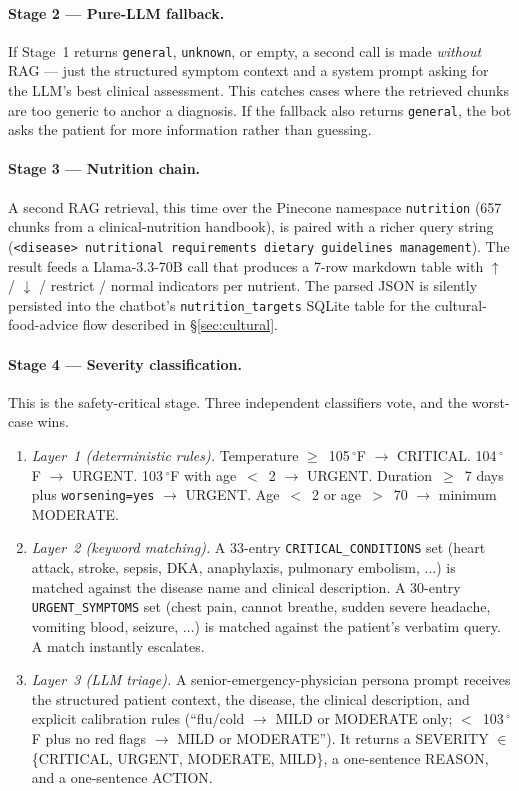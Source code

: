 \documentclass[12pt]{caltech_thesis}
\begin{document}
\paragraph{Stage 2 --- Pure-LLM fallback.} If Stage~1 returns
\texttt{general}, \texttt{unknown}, or empty, a second call is made
\textit{without} RAG --- just the structured symptom context and a system
prompt asking for the LLM's best clinical assessment. This catches cases
where the retrieved chunks are too generic to anchor a diagnosis. If the
fallback also returns \texttt{general}, the bot asks the patient for more
information rather than guessing.

\paragraph{Stage 3 --- Nutrition chain.} A second RAG retrieval, this
time over the Pinecone namespace \texttt{nutrition} (657 chunks from a
clinical-nutrition handbook), is paired with a richer query string
(\texttt{<disease> nutritional requirements dietary guidelines management}).
The result feeds a Llama-3.3-70B call that produces a 7-row markdown
table with $\uparrow$ / $\downarrow$ / restrict / normal indicators per
nutrient. The parsed JSON is silently persisted into the chatbot's
\texttt{nutrition\_targets} SQLite table for the cultural-food-advice flow
described in \S\ref{sec:cultural}.

\paragraph{Stage 4 --- Severity classification.} This is the safety-critical
stage. Three independent classifiers vote, and the worst-case wins.
\begin{enumerate}
    \item \textit{Layer~1 (deterministic rules).} Temperature
    $\geq$~105\,$^{\circ}$F $\rightarrow$ CRITICAL.
    104\,$^{\circ}$F $\rightarrow$ URGENT. 103\,$^{\circ}$F with
    age~$<$~2 $\rightarrow$ URGENT. Duration~$\geq$~7 days plus
    \texttt{worsening=yes} $\rightarrow$ URGENT. Age~$<$~2 or
    age~$>$~70 $\rightarrow$ minimum MODERATE.
    \item \textit{Layer~2 (keyword matching).} A 33-entry
    \texttt{CRITICAL\_CONDITIONS} set (heart attack, stroke, sepsis,
    DKA, anaphylaxis, pulmonary embolism, $\ldots$) is matched against
    the disease name and clinical description. A 30-entry
    \texttt{URGENT\_SYMPTOMS} set (chest pain, cannot breathe, sudden
    severe headache, vomiting blood, seizure, $\ldots$) is matched against
    the patient's verbatim query. A match instantly escalates.
    \item \textit{Layer~3 (LLM triage).} A senior-emergency-physician
    persona prompt receives the structured patient context, the disease,
    the clinical description, and explicit calibration rules
    (``flu/cold $\rightarrow$ MILD or MODERATE only; $<$~103\,$^{\circ}$F
    plus no red flags $\rightarrow$ MILD or MODERATE''). It returns a
    SEVERITY $\in$ \{CRITICAL, URGENT, MODERATE, MILD\}, a one-sentence
    REASON, and a one-sentence ACTION.
\end{enumerate}
\end{document}
